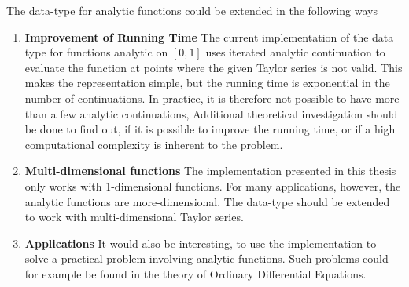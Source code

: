 The data-type for analytic functions could be extended in the following ways
\begin{enumerate}
  \item \textbf{Improvement of Running Time}
    The current implementation of the data type for functions analytic on
    $[0,1]$ uses iterated analytic continuation to evaluate the function at points where
    the given Taylor series is not valid. 
    This makes the representation simple, but the running time is exponential
    in the number of continuations.
    In practice, it is therefore not possible to have more than a few analytic
    continuations,
    Additional theoretical investigation should be done to find out, if it is
    possible to improve the running time, or if a high computational complexity
    is inherent to the problem.
  \item \textbf{Multi-dimensional functions}
    The implementation presented in this thesis only works with 1-dimensional
    functions. 
    For many applications, however, the analytic functions are
    more-dimensional.
    The data-type should be extended to work with multi-dimensional Taylor
    series.
  \item \textbf{Applications}
    It would also be interesting, to use the implementation to solve a
    practical problem involving analytic functions.
    Such problems could for example be found in the theory of Ordinary
    Differential Equations.
\end{enumerate}
